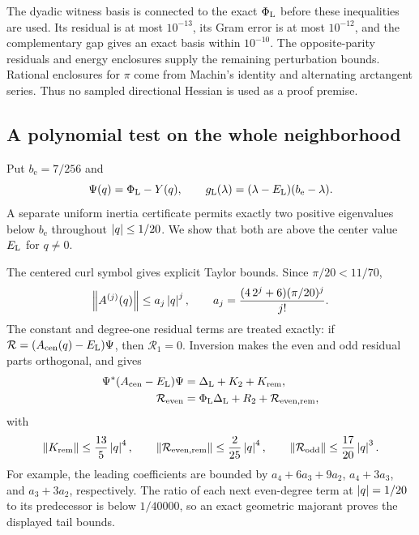 The dyadic witness basis is connected to the exact \(\Phi_{\rm L}\) before these
inequalities are used. Its residual is at most \(10^{-13}\), its Gram
error is at most \(10^{-12}\), and the complementary gap gives an exact
basis within \(10^{-10}\). The opposite-parity residuals and energy
enclosures supply the remaining perturbation bounds. Rational enclosures
for \(\pi\) come from Machin's identity and alternating arctangent
series. Thus no sampled directional Hessian is used as a proof premise.

\subsection{A polynomial test on the whole neighborhood}

Put \(b_{\mathrm e}=7/256\) and
\[
 \Psi(q)=\Phi_{\rm L}-Y(q),\qquad
 g_{\rm L}(\lambda)=(\lambda-E_{\rm L})(b_{\mathrm e}-\lambda).
\]
A separate uniform inertia certificate permits exactly two positive
eigenvalues below \(b_{\mathrm e}\) throughout \(\left\lvert q\right\rvert\le1/20\).
We show that both are above the center value \(E_{\rm L}\) for \(q\ne0\).

The centered curl symbol gives explicit Taylor bounds. Since
\(\pi/20<11/70\),
\[
 \left\lVert A^{(j)}(q)\right\rVert\le a_j\left\lvert q\right\rvert^j,\qquad
 a_j=\frac{(4\,2^j+6)(\pi/20)^j}{j!}.
\]
The constant and degree-one residual terms are treated exactly:
if \(\mathcal R=(A_{\rm cen}(q)-E_{\rm L})\Psi\), then \(\mathcal R_1=0\).
Inversion makes the even and odd residual parts orthogonal, and gives
\begin{align*}
 \Psi^*(A_{\rm cen}-E_{\rm L})\Psi&=\Delta_{\rm L}+K_2+K_{\mathrm{rem}},\\
 \mathcal R_{\mathrm{even}}&=\Phi_{\rm L}\Delta_{\rm L}+R_2+\mathcal R_{\mathrm{even,rem}},
\end{align*}
with
\[
 \left\lVert K_{\mathrm{rem}}\right\rVert\le\frac{13}{5}\left\lvert q\right\rvert^4,\qquad
 \left\lVert \mathcal R_{\mathrm{even,rem}}\right\rVert\le\frac2{25}\left\lvert q\right\rvert^4,\qquad
 \left\lVert \mathcal R_{\mathrm{odd}}\right\rVert\le\frac{17}{20}\left\lvert q\right\rvert^3.
\]
For example, the leading coefficients are bounded by
\(a_4+6a_3+9a_2\), \(a_4+3a_3\), and \(a_3+3a_2\), respectively.
The ratio of each next even-degree term at \(\left\lvert q\right\rvert=1/20\) to its predecessor
is below \(1/40000\), so an exact geometric majorant proves the displayed
tail bounds.

